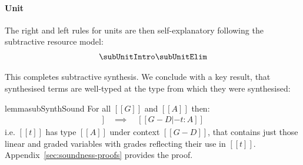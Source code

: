 \paragraph{Unit}
The right and left rules for units are then
self-explanatory following the subtractive resource model:
%
\begin{align*}
\begin{array}{c}
  \subUnitIntro
  \subUnitElim
\end{array}
\end{align*}

%

This completes subtractive synthesis. We conclude
with a key result, that synthesised terms are well-typed at the type from which they
were synthesised:
%
\begin{restatable}{lemma}{subSynthSound}
\label{lemma:subSynthSound}
For all $[[ G ]]$ and $[[ A ]]$
then:
\begin{align*}
[[ G |- A =>- t ; D ]] \quad \implies \quad [[ G - D |- t : A ]]
\end{align*}
i.e. $[[ t ]]$ has type $[[ A ]]$
under context $[[ G - D ]]$,
that contains just those linear and
graded variables with grades reflecting their use in $[[ t ]]$.
Appendix~\ref{sec:soundness-proofs} provides the proof.
\end{restatable}
%
\iffalse
\subsubsection{Alternative promotion}
We consider an alternate synthesis for graded modal terms,
replacing (R$\square^{-}$) (repeated on the left) with an alternate
version (R${\square'^{-}}$):
%
  \begin{align*}
    \subBox
    \;\;
    \subBoxAlt
    \end{align*}
%
  In this rule, the input context to the
  premise consists of the context $[[G]]$ ``divided'' by the grade of the goal type
  $[[r]]$ where division is defined:
%
\begin{align*}
   [[ . / r ]] = [[ . ]]
    \qquad\qquad
  [[ (G , x : [ A ] s) / r ]] = [[ G' / r, x : [A] s' ]]\ where\ [[ exists s' . s'
  * r = s ]]
\end{align*}
  Similarly to context subtraction, context division existentially quantifies
  over a grade $s'$ to express the relationship between the grades
  in the context $[[G]]$ being ``divided'' by $r$. %
  The output context for the synthesis of $[[t]]$ is then multiplied
  by $r$ in the conclusion of the rule. Such constraints require the
  SMT solver to compute a factorisation, which is typically expensive.
  Section~\ref{sec:evaluation} considers the cost implications, comparing
  performance of (R$\square^{-}$) versus (R${\square^{-}}'$).
\fi

